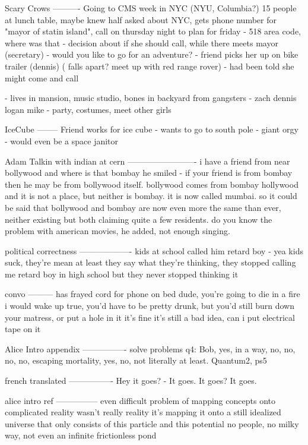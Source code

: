 Scary Crows
----------
Going to CMS week in NYC (NYU, Columbia?)
 15 people at lunch table, maybe knew half
 asked about NYC, gets phone number for "mayor of statin island", call on thursday night to plan for friday
 - 518 area code, where was that
 - decision about if she should call, while there meets mayor (secretary)
  - would you like to go for an adventure?
   - friend picks her up on bike trailer (dennis)
    ( falls apart? meet up with red range rover)
   - had been told she might come and call
   
  - lives in mansion, music studio, bones in backyard from gangsters
  - zach dennis logan mike
  - party, costumes, meet other girls 



IceCube
--------
Friend works for ice cube
 - wants to go to south pole
  - giant orgy
  - would even be a space janitor


Adam Talkin with indian at cern
-------------------------
i have a friend from near bollywood
and where is that
bombay
he smiled - if your friend is from bombay then he may be from bollywood itself. bollywood comes from bombay hollywood and it is not a place, but neither is bombay. it is now called mumbai. so it could be said that bollywood and bombay are now even more the same than ever, neither existing but both claiming quite a few residents. do you know the problem with american movies, he added, not enough singing.

political correctness
-------------------
kids at school called him retard boy 
 - yea kids suck, they're mean
at least they say what they're thinking, they stopped calling me retard boy in high school but they never stopped thinking it


convo
---------
 has frayed cord for phone on bed
 dude, you're going to die in a fire
 i would wake up
 true, you'd have to be pretty drunk, but you'd still burn down your matress, or put a hole in it
 it's fine
 it's still a bad idea, can i put electrical tape on it




Alice Intro appendix
----------------
solve problems
q4: 
Bob, yes, in a way, no, no, no, no, escaping mortality, yes, no, not literally at least.
Quantum2, ps5

french translated
----------------
Hey it goes?
 - It goes. It goes?
It goes.



alice intro ref
---------------
even difficult problem of mapping concepts onto complicated reality wasn't really reality
it's mapping it onto a still idealized universe that only consists of this particle and this potential
no people, no milky way, not even an infinite frictionless pond


